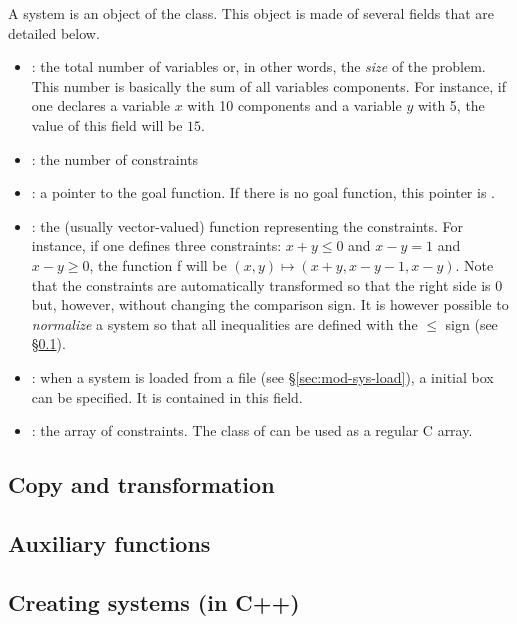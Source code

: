 A system is an object of the  class. This object is made of several fields
that are detailed below. %

\begin{itemize}
\item {} : the total number of variables or, in other words, the
{\it size} of the problem. This number is basically the sum of all variables components. For instance,
if one declares a variable $x$ with 10 components and a variable $y$ with 5, the value of this field
will be $15$.
\item {} : the number of constraints
\item {} : a pointer to the goal function. If there is no goal function, this
pointer is .
\item {} : the (usually vector-valued) function representing the constraints. 
For instance, if one defines three constraints: $x+y\leq0$ and $x-y=1$ and $x-y\geq0$, the function f will be 
$(x,y)\mapsto (x+y,x-y-1,x-y)$. Note that the constraints are automatically transformed so that the right side 
is 0 but, however, without changing the comparison sign. It is however possible to {\it normalize} a system so that
all inequalities are defined with the $\le$ sign (see \S\ref{sec:mod-sys-transfo}).
\item {} : when a system is loaded from a file (see \S\ref{sec:mod-sys-load}),
a initial box can be specified. It is contained in this field.
\item {} : the array of constraints. The  class of \ibex can
be used as a regular C array.
\end{itemize}

\subsection{Copy and transformation}\label{sec:mod-sys-transfo}

\subsection{Auxiliary functions}\label{sec:mod-sys-auxfunc}

\subsection{Creating systems (in C++)}

